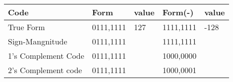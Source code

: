 \documentclass[
  11pt, %
  xcolor=dvipsnames
]{beamer}
\begin{document}
\begin{frame}[fragile]


	\begin{columns}[c]
		\begin{column}{0.9\textwidth}

			\begin{table}
				\begin{tabular}{l l l l l}
					\toprule
					Code                & Form      & value & Form(-)   & value \\
					\midrule
					True Form           & 0111,1111 & 127   & 1111,1111 & -128  \\
					Sign-Mangnitude     & 0111,1111 &       & 1111,1111 &       \\
					1's Complement Code & 0111,1111 &       & 1000,0000 &       \\
					2's Complement code & 0111,1111 &       & 1000,0001 &       \\
					\bottomrule
				\end{tabular}
			\end{table}

		\end{column}
	\end{columns}

\end{frame}
\end{document}
